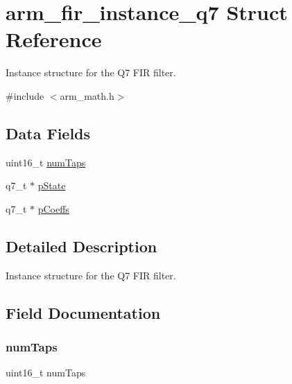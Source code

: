 \hypertarget{structarm__fir__instance__q7}{}\section{arm\+\_\+fir\+\_\+instance\+\_\+q7 Struct Reference}
\label{structarm__fir__instance__q7}


Instance structure for the Q7 F\+IR filter.  




{\ttfamily \#include $<$arm\+\_\+math.\+h$>$}

\subsection*{Data Fields}
\begin{DoxyCompactItemize}
\item 
uint16\+\_\+t \mbox{\hyperlink{structarm__fir__instance__q7_a751941891e47f522a7f5375fe8990aac}{num\+Taps}}
\item 
q7\+\_\+t $\ast$ \mbox{\hyperlink{structarm__fir__instance__q7_aa8f67102521b620af6f259afdcf29785}{p\+State}}
\item 
q7\+\_\+t $\ast$ \mbox{\hyperlink{structarm__fir__instance__q7_a54407554b4fe7bbbb43924e4eea45e7f}{p\+Coeffs}}
\end{DoxyCompactItemize}


\subsection{Detailed Description}
Instance structure for the Q7 F\+IR filter. 

\subsection{Field Documentation}
\mbox{\label{structarm__fir__instance__q7_a751941891e47f522a7f5375fe8990aac}} 
\subsubsection{\texorpdfstring{num\+Taps}{numTaps}}
{\footnotesize\ttfamily uint16\+\_\+t num\+Taps}

